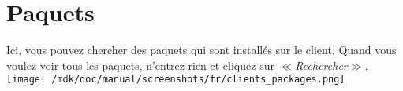 \section{Paquets}Ici, vous pouvez chercher des paquets qui sont install\'es sur le client. Quand vous voulez voir tous les paquets, n'entrez rien et cliquez sur \textit{$\ll$Rechercher$\gg$}.\\
\texttt{[image: /mdk/doc/manual/screenshots/fr/clients\_packages.png]} \\
